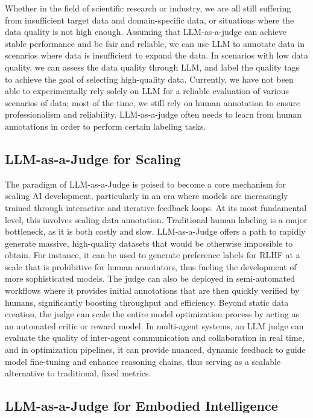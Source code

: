 \documentclass[acmsmall,screen]{acmart}
\begin{document}
Whether in the field of scientific research or industry, we are all still suffering from insufficient target data and domain-specific data, or situations where the data quality is not high enough. Assuming that LLM-as-a-judge can achieve stable performance and be fair and reliable, we can use LLM to annotate data in scenarios where data is insufficient to expand the data. In scenarios with low data quality, we can assess the data quality through LLM, and label the quality tags to achieve the goal of selecting high-quality data. Currently, we have not been able to experimentally rely solely on LLM for a reliable evaluation of various scenarios of data; most of the time, we still rely on human annotation to ensure professionalism and reliability. LLM-as-a-judge often needs to learn from human annotations in order to perform certain labeling tasks.




\subsection{LLM-as-a-Judge for Scaling}\label{subsec:llm_judge_scaling}

The paradigm of LLM-as-a-Judge is poised to become a core mechanism for scaling AI development, particularly in an era where models are increasingly trained through interactive and iterative feedback loops. At its most fundamental level, this involves scaling data annotation. Traditional human labeling is a major bottleneck, as it is both costly and slow. LLM-as-a-Judge offers a path to rapidly generate massive, high-quality datasets that would be otherwise impossible to obtain. For instance, it can be used to generate preference labels for RLHF at a scale that is prohibitive for human annotators, thus fueling the development of more sophisticated models. The judge can also be deployed in semi-automated workflows where it provides initial annotations that are then quickly verified by humans, significantly boosting throughput and efficiency. Beyond static data creation, the judge can scale the entire model optimization process by acting as an automated critic or reward model. In multi-agent systems, an LLM judge can evaluate the quality of inter-agent communication and collaboration in real time, and in optimization pipelines, it can provide nuanced, dynamic feedback to guide model fine-tuning and enhance reasoning chains, thus serving as a scalable alternative to traditional, fixed metrics.

\subsection{LLM-as-a-Judge for Embodied Intelligence}\label{subsec:llm_judge_embodied}
\end{document}
